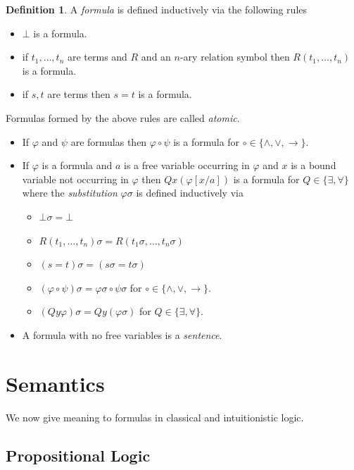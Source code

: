 \documentclass[a4paper,11pt]{report}
\theoremstyle{definition}
\theoremstyle{definition}
\theoremstyle{definition}
\theoremstyle{definition}
\theoremstyle{definition}
\newtheorem{definition}[theorem]{Definition}
\theoremstyle{definition}
\theoremstyle{definition}
\begin{document}
	\begin{definition}
		A \textit{formula} is defined inductively via the following rules
		\begin{itemize}
			\item $\bot$ is a formula.
			\item if $t_1,\dots,t_n$ are terms and $R$ and an $n$-ary relation symbol then $R(t_1, \dots, t_n)$ is a formula.
			\item if $s, t$ are terms then $s = t$ is a formula.
		\end{itemize}	
		Formulas formed by the above rules are called \textit{atomic}.
		\begin{itemize}
			\item If $\varphi$ and $\psi$ are formulas then $\varphi\circ\psi$ is a formula for $\circ\in\{\wedge,\vee,\to\}$.
			\item If $\varphi$ is a formula and $a$ is a free variable occurring in $\varphi$ and $x$ is a bound variable not occurring in $\varphi$ then $Qx(\varphi[x/a])$ is a formula for $Q\in\{\exists,\forall\}$ where the \textit{substitution} $\varphi\sigma$ is defined inductively via
			\begin{itemize}
				\item $\bot\sigma = \bot$
				\item $R(t_1,\dots,t_n)\sigma = R(t_1\sigma,\dots, t_n\sigma)$
				\item $(s = t)\sigma = (s\sigma = t\sigma)$
				\item $(\varphi\circ\psi)\sigma = \varphi\sigma\circ\psi\sigma$ for $\circ\in\{\wedge,\vee,\to\}$.
				\item $(Qy\varphi)\sigma = Qy(\varphi\sigma)$ for $Q\in\{\exists,\forall\}$.
			\end{itemize}
			\item A formula with no free variables is a \textit{sentence}.
		\end{itemize}
	\end{definition}

	\section{Semantics}
	
	We now give meaning to formulas in classical and intuitionistic logic.
	
	\subsection{Propositional Logic}
\end{document}
